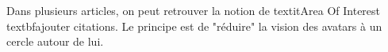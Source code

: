 Dans plusieurs articles, on peut retrouver la notion de textit{Area Of Interest} textbf{ajouter citations}. Le principe est de "réduire" la vision des avatars à un cercle autour de lui.
